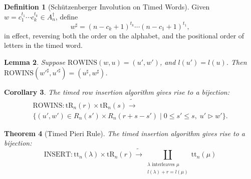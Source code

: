 \documentclass[12pt]{amsart}
\newtheorem{theorem}{Theorem}[subsection]
\newtheorem{lemma}[theorem]{Lemma}
\newtheorem{corollary}[theorem]{Corollary}
\theoremstyle{definition}
\newtheorem{definition}[theorem]{Definition}
\newcommand{\rowins}{\mathrm{ROWINS}}
\newcommand{\ins}{\mathrm{INSERT}}
\newcommand{\ttab}{\mathrm{tt}}
\newcommand{\tr}{\mathrm{tR}}
\begin{document}
\begin{definition}
  [Sch\"utzenberger Involution on Timed Words]
  \label{definition:schuetzenberger-involution}
  Given $w=c_1^{t_1}\dotsb c_k^{t_k}\in A_n^\dagger$, define
  \begin{equation}
    \label{eq:sharp}
    w^\sharp = (n-c_k+1)^{t_k} \dotsb (n-c_1+1)^{t_1},
  \end{equation}
  in effect, reversing both the order on the alphabet, and the positional order of letters in the timed word.
\end{definition}
\begin{lemma}
  \label{lemma:reverse-row-insertion}
  Suppose $\rowins(w,u)=(u',w')$, and $l(u')=l(u)$.
  Then $\rowins({w'}^\sharp,{u'}^\sharp)=(u^\sharp,w^\sharp)$.
\end{lemma}
\begin{corollary}
  \label{corollary:row-insertion-bijection}
  The timed row insertion algorithm gives rise to a bijection:
  \begin{multline*}
    \rowins: \tr_n(r)\times \tr_n(s) \tilde\to \\\{(u',w')\in R_n(s')\times R_n(r+s-s')\mid 0\leq s'\leq s,\; u'\rhd w'\}. 
  \end{multline*}
\end{corollary}
\begin{theorem}[Timed Pieri Rule]
  \label{theorem:pieri}
  The timed insertion algorithm gives rise to a bijection:
  \begin{displaymath}
    \ins: \ttab_n(\lambda)\times \tr_n(r) \tilde\to \coprod_{\begin{smallmatrix}\text{$\lambda$ interleaves $\mu$}\\{l(\lambda)+r = l(\mu)}\end{smallmatrix}} \ttab_n(\mu)
  \end{displaymath}
\end{theorem}
\end{document}
